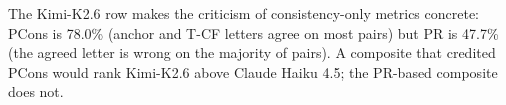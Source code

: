 \documentclass{article}
\begin{document}
The Kimi-K2.6 row makes the criticism of consistency-only metrics concrete: PCons is 78.0\% (anchor and T-CF letters agree on most pairs) but PR is 47.7\% (the agreed letter is wrong on the majority of pairs). A composite that credited PCons would rank Kimi-K2.6 above Claude Haiku 4.5; the PR-based composite does not.

\clearpage

\end{document}
